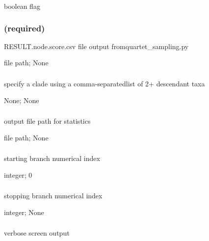 \documentclass[letterpaper,12pt,english]{sphinxmanual}
\begin{document}
 boolean flag


\subsubsection{ (required)}
\label{\detokenize{prog_desc:data-required}}
 RESULT.node.score.csv file output fromquartet\_sampling.py

 file path;  None


\subsubsection{}
\label{\detokenize{prog_desc:id17}}
 specify a clade using a comma-separatedlist of 2+ descendant taxa

 None;  None


\subsubsection{}
\label{\detokenize{prog_desc:out}}
 output file path for statistics

 file path;  None


\subsubsection{}
\label{\detokenize{prog_desc:id18}}
 starting branch numerical index

 integer;  0


\subsubsection{}
\label{\detokenize{prog_desc:id19}}
 stopping branch numerical index

 integer;  None


\subsubsection{}
\label{\detokenize{prog_desc:id20}}
 verbose screen output
\end{document}
